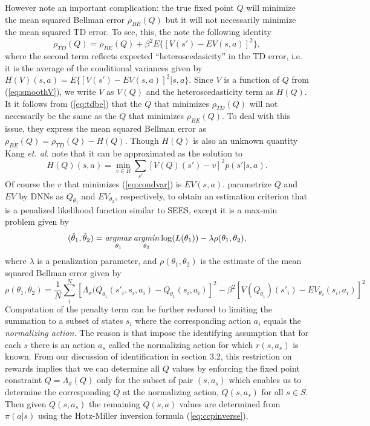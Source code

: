 However \citet{kang:2025} note an important  complication: the true fixed point $Q$ will minimize
the mean squared Bellman error $\rho_{BE}(Q)$ but it will not necessarily minimize the mean squared
TD error. To see, this, the note the following identity
\begin{equation}
   \rho_{TD}(Q)=\rho_{BE}(Q)+\beta^2 E\{[V(s')-EV(s,a)]^2\},
\label{eq:tdbe}
\end{equation}
where the second term reflects expected ``heteroscedasicity'' in the TD error, i.e. it is the average of the
conditional variances given by $H(V)(s,a)=E\{[V(s')-EV(s,a)]^2|s,a\}$. Since $V$ is a function of $Q$
from (\ref{eq:smoothV}), we write $V$ as $V(Q)$ and the heteroscedasticity term as $H(Q)$.  It 
it follows from (\ref{eq:tdbe}) that the $Q$ that minimizes $\rho_{TD}(Q)$ will not necessarily be the same as the $Q$ that minimizes $\rho_{BE}(Q)$.
To deal with this issue, they express the mean squared Bellman
error as  $\rho_{BE}(Q)=\rho_{TD}(Q)-H(Q)$. Though $H(Q)$ is also an unknown quantity
Kang {\it et. al.\/}  note that it can be approximated as the solution to
\begin{equation}
             H(Q)(s,a) =\min_{v \in R} \sum_{s'}[V(Q)(s')-v]^2 p(s'|s,a).
\label{eq:condvar}
\end{equation}
Of course the $v$ that minimizes (\ref{eq:condvar}) is  $EV(s,a)$.  \citet{kang:2025} parametrize $Q$ and $EV$  by DNNs as 
$Q_{\theta_1}$ and $EV_{\theta_2}$, respectively, to obtain an estimation criterion that is a penalized likelihood
function similar to SEES, except it is a max-min problem  given by
\begin{equation}
       (\hat\theta_1,\hat\theta_2) =\mathop{\it argmax}_{\theta_1}\mathop{\it argmin}_{\theta_2} \log(L(\theta_1))-\lambda\rho(\theta_1,\theta_2),
\label{eq:maxmin}
\end{equation}
where $\lambda$ is a penalization parameter, and $\rho(\theta_1,\theta_2)$ is the estimate of the mean squared Bellman error
given by
\begin{equation}
       \rho(\theta_1,\theta_2) =\frac{1}{N} \sum_i^N [\Lambda_\sigma(Q_{\theta_1}(s'_i,s_i,a_i)-Q_{\theta_1}(s_i,a_i)]^2 - \beta^2
 [V(Q_{\theta_1})(s'_i)-EV_{\theta_2}(s_i,a_i)]^2 
\label{eq:kangpenality}
\end{equation}
Computation of the penalty term can be further reduced to limiting the summation to a subset of states
$s_i$ where the corresponding action $a_i$ equals the {\it normalizing action.\/} The reason is that
\cite{kang:2025} impose the identifying assumption that for each $s$ there is an action $a_s$ called the
normalizing action for which $r(s,a_s)$ is known. From our discussion of identification in section 3.2, this
restriction on rewards implies that we can determine all $Q$ values by enforcing the fixed point
constraint $Q=\Lambda_\sigma(Q)$ only for the subset of pair $(s,a_s)$ which enables us to determine the
corresponding $Q$ at the normalizing action,  $Q(s,a_s)$ for all $s \in S$. Then given $Q(s,a_s)$ the remaining
$Q(s,a)$ values are determined from $\pi(a|s)$ using the Hotz-Miller inversion  formula (\ref{eq:ccpinverse}).

